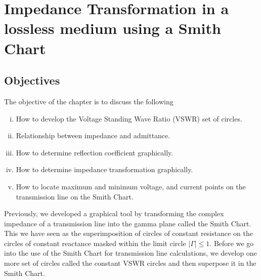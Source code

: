 \chapter{Impedance Transformation in a lossless medium using a Smith Chart}\label{lec:lec8}
\section{Objectives}
The objective of the chapter is to discuss the following
\begin{enumerate}[(i)]
\item How to develop the Voltage Standing Wave Ratio (VSWR) set of circles.
\item Relationship between impedance and admittance.
\item How to determine reflection coefficient graphically.
\item How to determine impedance transformation graphically.
\item How to locate maximum and minimum voltage, and current points on the transmission line on the Smith Chart.
\end{enumerate}

Previously, we developed a graphical tool by transforming the complex impedance of a transmission line into the gamma plane called the Smith Chart. This we have seen as the superimposition of circles of constant resistance on the circles of constant reactance masked within the limit circle $|\Gamma| \leq 1$. Before we go into the use of the Smith Chart for transmission line calculations, we develop one more set of circles called the constant VSWR circles and then superpose it in the Smith Chart.

